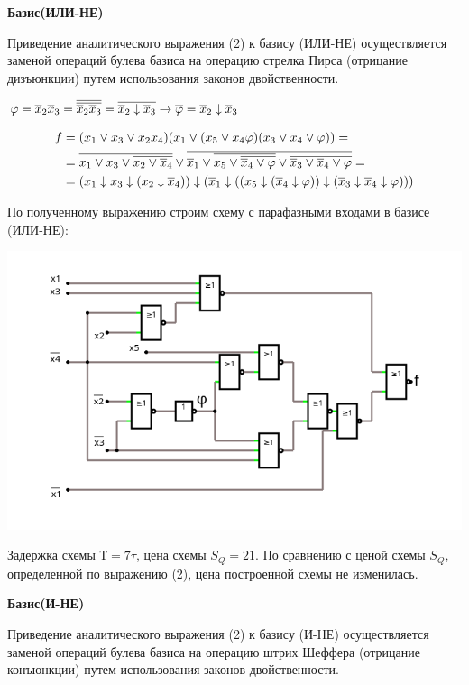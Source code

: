 \begin{center}
  \textbf{Базис(ИЛИ-НЕ)}
\end{center}

Приведение аналитического выражения (2) к базису (ИЛИ-НЕ) осуществляется заменой операций булева базиса на операцию стрелка Пирса (отрицание дизъюнкции) путем использования законов двойственности. 

$
\varphi = \overline{x}_{2}\overline{x}_{3}= \overline{\overline{\overline{x}_{2}\overline{x}_{3}}}= \overline{\overline{x}_{2}\downarrow\overline{x}_{3}} \rightarrow \overline{\varphi} = \overline{x}_{2}\downarrow\overline{x}_{3} 
$

\begin{align*}
f &= (x_{1}\vee x_{3}\vee\overline{x}_{2}x_{4})(\overline{x}_{1}\vee(x_{5}\vee x_{4}\overline{\varphi})(\overline{x}_{3} \vee \overline{x}_{4} \vee \varphi)) = \\
  &=\overline{ x_{1}\vee x_{3}\vee \overline{x_{2}\vee\overline{x}_{4}} }
    \vee
    \overline{
      \overline{x}_{1} \vee
      \overline{ x_{5} \vee \overline{\overline{x}_{4}\vee\varphi}} \vee
      \overline{ \overline{x}_{3} \vee \overline{x}_{4} \vee \varphi   }
    } = \\
  &=(x_{1}\downarrow x_{3}\downarrow (x_{2}\downarrow\overline{x}_{4}))
    \downarrow
    (\overline{x}_{1} \downarrow
      (
        (x_{5} \downarrow (\overline{x}_{4}\downarrow\varphi)) 
        \downarrow
        (\overline{x}_{3} \downarrow \overline{x}_{4} \downarrow \varphi)
      )
    )
\end{align*}

По полученному выражению строим схему с парафазными входами в базисе (ИЛИ-НЕ):
\begin{center}
\includegraphics[width=\linewidth]{imgs/circuit-ORNOT_basis.png}
\end{center}
Задержка схемы $Т=7\tau$, цена схемы $S_Q=21$. По сравнению с ценой схемы $S_Q$, определенной по выражению (2), цена построенной схемы не изменилась. 

\begin{center}
  \textbf{Базис(И-НЕ)}
\end{center}
Приведение аналитического выражения (2) к базису (И-НЕ) осуществляется заменой операций булева базиса на операцию штрих Шеффера (отрицание конъюнкции) путем использования законов двойственности.

